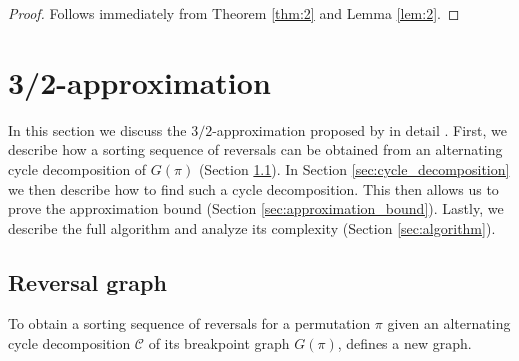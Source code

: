 \documentclass[11pt,DIV=11]{scrartcl}
\theoremstyle{definition}
\theoremstyle{remark}
\begin{document}
\begin{proof}
Follows immediately from Theorem \ref{thm:2} and Lemma \ref{lem:2}.
\end{proof}

\section{3/2-approximation}
\label{sec:32_approximation}

In this section we discuss the $3/2$-approximation proposed by \citeauthor*{Christie1998} in detail \cite{Christie1998}. First, we describe how a sorting sequence of reversals can be obtained from an alternating cycle decomposition of $G(\pi)$ (Section \ref{sec:reversal_graph}). In Section \ref{sec:cycle_decomposition} we then describe how to find such a cycle decomposition. This then allows us to prove the approximation bound (Section \ref{sec:approximation_bound}). Lastly, we describe the full algorithm and analyze its complexity (Section \ref{sec:algorithm}).

\subsection{Reversal graph}
\label{sec:reversal_graph}

To obtain a sorting sequence of reversals for a permutation $\pi$ given an alternating cycle decomposition $\mathcal{C}$ of its breakpoint graph $G(\pi)$, \citeauthor*{Christie1998} defines a new graph.
\end{document}
